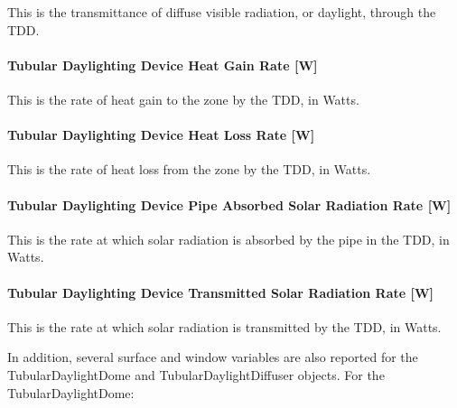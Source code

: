 This is the transmittance of diffuse visible radiation, or daylight, through the TDD.

\paragraph{Tubular Daylighting Device Heat Gain Rate {[}W{]}}\label{tubular-daylighting-device-heat-gain-rate-w}

This is the rate of heat gain to the zone by the TDD, in Watts.

\paragraph{Tubular Daylighting Device Heat Loss Rate {[}W{]}}\label{tubular-daylighting-device-heat-loss-rate-w}

This is the rate of heat loss from the zone by the TDD, in Watts.

\paragraph{Tubular Daylighting Device Pipe Absorbed Solar Radiation Rate {[}W{]}}\label{tubular-daylighting-device-pipe-absorbed-solar-radiation-rate-w}

This is the rate at which solar radiation is absorbed by the pipe in the TDD, in Watts.

\paragraph{Tubular Daylighting Device Transmitted Solar Radiation Rate {[}W{]}}\label{tubular-daylighting-device-transmitted-solar-radiation-rate-w}

This is the rate at which solar radiation is transmitted by the TDD, in Watts.

In addition, several surface and window variables are also reported for the TubularDaylightDome and TubularDaylightDiffuser objects. For the TubularDaylightDome:

